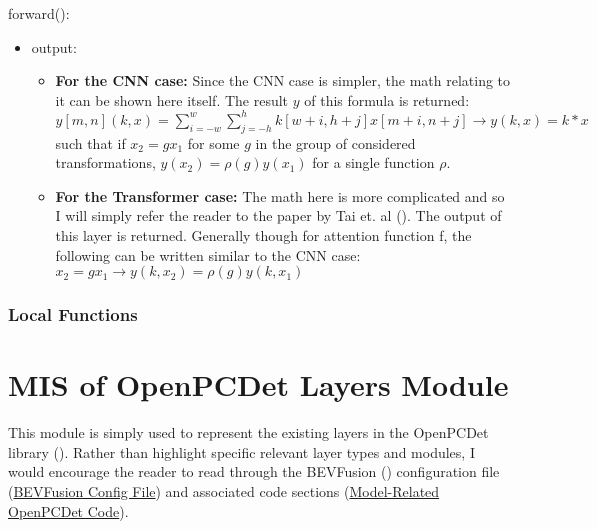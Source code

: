 \documentclass[12pt, titlepage]{article}
\begin{document}
\noindent forward():
\begin{itemize}
\item output:
\begin{itemize}
  \item \textbf{For the CNN case:} Since the CNN case is simpler, the math relating to it can be shown here itself. The result $y$ of this formula is returned:
  \newline\newline
  $y[m,n](k,x)=\sum_{i=-w}^{w}\sum_{j=-h}^{h}k[w+i,h+j]x[m+i,n+j]\rightarrow{}y(k,x)=k*x$ \newline
  such that if $x_{2}=gx_{1}$ for some $g$ in the group of considered transformations, $y(x_{2})=\rho(g)y(x_{1})$
  for a single function $\rho$.
  \newline
  \item \textbf{For the Transformer case:} The math here is more complicated and so I will simply refer the reader to the paper by Tai et. al (\cite{tai2019equivariant}). The output of this layer is returned. Generally though for attention function f,
  the following can be written similar to the CNN case:
  $x_{2}=gx_{1} \rightarrow{} y(k,x_{2})=\rho(g)y(k,x_{1})$ 
\end{itemize}
\end{itemize}

\subsubsection{Local Functions}

\newpage

\section{MIS of OpenPCDet Layers Module} \label{Module} 
This module is simply used to represent the existing layers in the OpenPCDet library (\cite{openpcdet2020}).
Rather than highlight specific relevant layer types and modules, I would encourage the reader to read through the BEVFusion (\cite{liang2022bevfusion})
configuration file (\href{https://github.com/open-mmlab/OpenPCDet/blob/master/tools/cfgs/nuscenes_models/bevfusion.yaml}{BEVFusion Config File}) and 
associated code sections (\href{https://github.com/open-mmlab/OpenPCDet/tree/master/pcdet/models}{Model-Related OpenPCDet Code}).

\newpage
\end{document}
